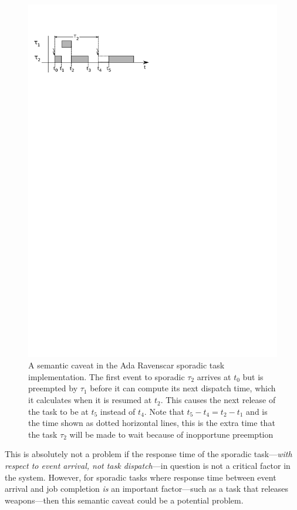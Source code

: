 \begin{figure}
\centering
\includegraphics{figs/sporadic_caveat}
\caption[Sporadic task breaching its specification.]{A semantic caveat
  in the Ada Ravenscar sporadic task implementation. The first event
  to sporadic $\tau_2$ arrives at $t_0$ but is preempted by $\tau_1$
  before it can compute its next dispatch time, which it calculates
  when it is resumed at $t_2$. This causes the next release of the
  task to be at $t_5$ instead of $t_4$. Note that $t_5 - t_4 = t_2 -
  t_1$ and is the time shown as dotted horizontal lines, this is the
  extra time that the task $\tau_2$ will be made to wait because of
  inopportune preemption}
\label{fig:caveat}
\end{figure}

This is absolutely not a problem if the response time of the sporadic
task---\emph{with respect to event arrival, not task dispatch}---in
question is not a critical factor in the system. However, for sporadic
tasks where response time between event arrival and job completion
\emph{is} an important factor---such as a task that releases
weapons---then this semantic caveat could be a potential problem.

